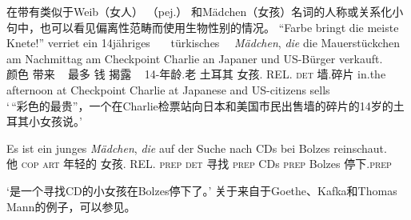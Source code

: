 在带有类似于Weib（女人） （pej.） 和Mädchen（女孩）名词的人称或关系化小句中，也可以看见偏离性范畴而使用生物性别的情况。
\eal
\ex 
\gll "`Farbe bringt die meiste Knete!"' verriet ein 14jähriges~~~ türkisches~~ \emph{Mädchen}, \emph{die} die Mauerstückchen am      Nachmittag am Checkpoint Charlie an Japaner und US-Bürger verkauft.\footnotemark\\
颜色 带来 \deter~ 最多 钱 揭露 \deter~ 14-年龄.老  土耳其 女孩.\neu{} REL.\fem{} \textsc{det} 墙.碎片
in.the afternoon at Checkpoint Charlie at Japanese and US-citizens sells\\  
\glt `\,“彩色的最贵”，一个在Charlie检票站向日本和美国市民出售墙的碎片的14岁的土耳其小女孩说。'
\ex 
{\raggedright
\gll Es ist ein junges {\em Mädchen\/}, {\em die\/} auf der Suche nach CDs bei Bolzes reinschaut.\footnotemark\\
	 他 \textsc{cop} \textsc{art} 年轻的 女孩.\neu{} REL.\fem{} \textsc{prep} \textsc{det} 寻找 \textsc{prep} CDs \textsc{prep} Bolzes 停下.\textsc{prep}\\
\par}
\glt `是一个寻找CD的小女孩在Bolzes停下了。' 
\zl
关于来自于Goethe、Kafka和Thomas Mann的例子，可以参见。

